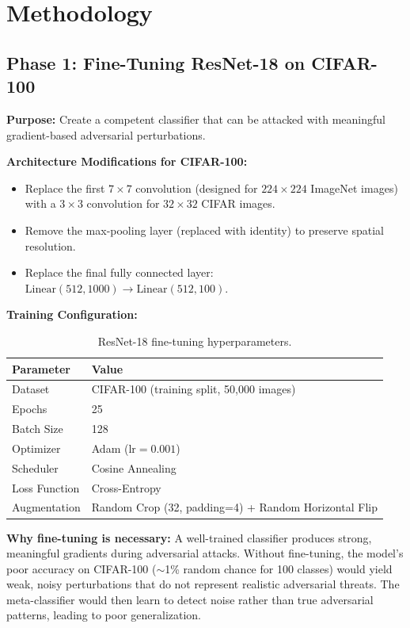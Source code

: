\documentclass[12pt, a4paper]{article}
\begin{document}
\section{Methodology}

\subsection{Phase 1: Fine-Tuning ResNet-18 on CIFAR-100}

\textbf{Purpose:} Create a competent classifier that can be attacked
with meaningful gradient-based adversarial perturbations.

\textbf{Architecture Modifications for CIFAR-100:}
\begin{itemize}[nosep]
    \item Replace the first $7 \times 7$ convolution (designed for
          $224 \times 224$ ImageNet images) with a $3 \times 3$
          convolution for $32 \times 32$ CIFAR images.
    \item Remove the max-pooling layer (replaced with identity) to
          preserve spatial resolution.
    \item Replace the final fully connected layer:
          $\text{Linear}(512, 1000) \rightarrow \text{Linear}(512, 100)$.
\end{itemize}

\textbf{Training Configuration:}
\begin{table}[H]
\centering
\caption{ResNet-18 fine-tuning hyperparameters.}
\begin{tabular}{@{}ll@{}}
\toprule
\textbf{Parameter} & \textbf{Value} \\
\midrule
Dataset       & CIFAR-100 (training split, 50{,}000 images) \\
Epochs        & 25 \\
Batch Size    & 128 \\
Optimizer     & Adam ($\text{lr} = 0.001$) \\
Scheduler     & Cosine Annealing \\
Loss Function & Cross-Entropy \\
Augmentation  & Random Crop (32, padding=4) + Random Horizontal Flip \\
\bottomrule
\end{tabular}
\end{table}

\textbf{Why fine-tuning is necessary:}
A well-trained classifier produces strong, meaningful gradients during
adversarial attacks. Without fine-tuning, the model's poor accuracy on
CIFAR-100 ($\sim$1\% random chance for 100 classes) would yield weak,
noisy perturbations that do not represent realistic adversarial threats.
The meta-classifier would then learn to detect noise rather than true
adversarial patterns, leading to poor generalization.
\end{document}
